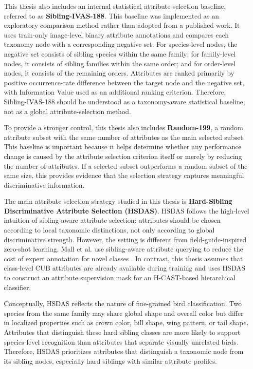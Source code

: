 This thesis also includes an internal statistical attribute-selection baseline, referred to as \textbf{Sibling-IVAS-188}. This baseline was implemented as an exploratory comparison method rather than adopted from a published work. It uses train-only image-level binary attribute annotations and compares each taxonomy node with a corresponding negative set. For species-level nodes, the negative set consists of sibling species within the same family; for family-level nodes, it consists of sibling families within the same order; and for order-level nodes, it consists of the remaining orders. Attributes are ranked primarily by positive occurrence-rate difference between the target node and the negative set, with Information Value used as an additional ranking criterion. Therefore, Sibling-IVAS-188 should be understood as a taxonomy-aware statistical baseline, not as a global attribute-selection method.



To provide a stronger control, this thesis also includes \textbf{Random-199}, a random attribute subset with the same number of attributes as the main selected subset. This baseline is important because it helps determine whether any performance change is caused by the attribute selection criterion itself or merely by reducing the number of attributes. If a selected subset outperforms a random subset of the same size, this provides evidence that the selection strategy captures meaningful discriminative information.

The main attribute selection strategy studied in this thesis is \textbf{Hard-Sibling Discriminative Attribute Selection (HSDAS)}. HSDAS follows the high-level intuition of sibling-aware attribute selection: attributes should be chosen according to local taxonomic distinctions, not only according to global discriminative strength. However, the setting is different from field-guide-inspired zero-shot learning. Mall et al. use sibling-aware attribute querying to reduce the cost of expert annotation for novel classes \cite{mall2021field}. In contrast, this thesis assumes that class-level CUB attributes are already available during training and uses HSDAS to construct an attribute supervision mask for an H-CAST-based hierarchical classifier.

Conceptually, HSDAS reflects the nature of fine-grained bird classification. Two species from the same family may share global shape and overall color but differ in localized properties such as crown color, bill shape, wing pattern, or tail shape. Attributes that distinguish these hard sibling classes are more likely to support species-level recognition than attributes that separate visually unrelated birds. Therefore, HSDAS prioritizes attributes that distinguish a taxonomic node from its sibling nodes, especially hard siblings with similar attribute profiles.

